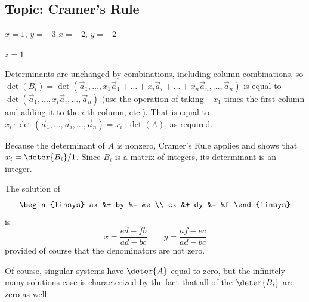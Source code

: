 \subsection{Topic: Cramer's Rule}
\begin{ans}{1}
      \begin{exparts*}
        \partsitem $x=1$, $y=-3$
        \partsitem $x=-2$, $y=-2$
      \end{exparts*}
    
\end{ans}
\begin{ans}{2}
      \( z=1 \)
    
\end{ans}
\begin{ans}{3}
      Determinants are unchanged by combinations,
      including column combinations, so
      \( \det(B_i)=\det(\vec{a}_1,\dots,
      x_1\vec{a}_1+\dots+x_i\vec{a}_i+\dots+x_n\vec{a}_n,\dots,\vec{a}_n) \)
      is equal to
      $\det(\vec{a}_1,\dots,x_i\vec{a}_i,\dots,\vec{a}_n)$
      (use the operation of taking $-x_1$ times the first column and adding
      it to the $i$-th column, etc.).
      That is equal to
      $x_i\cdot\det(\vec{a}_1,\dots,\vec{a}_i,\dots,\vec{a}_n)
         =x_i\cdot\det(A)$,
      as required.
    
\end{ans}
\begin{ans}{4}
      Because the determinant of $A$ is nonzero, Cramer's Rule applies and
      shows that $x_i=\deter{B_i}/1$.
      Since $B_i$ is a matrix of integers, its determinant is an integer.
    
\end{ans}
\begin{ans}{5}
      The solution of
      \begin{equation*}
        \begin{linsys}{2}
           ax  &+  by  &=  &e  \\
           cx  &+  dy  &=  &f
        \end{linsys}
      \end{equation*}
      is
      \begin{equation*}
        x=\frac{ed-fb}{ad-bc}
        \qquad
        y=\frac{af-ec}{ad-bc}
      \end{equation*}
      provided of course that the denominators are not zero.
    
\end{ans}
\begin{ans}{6}
      Of course, singular systems have \( \deter{A} \) equal to zero, but
      the infinitely many solutions case is characterized by the fact that
      all of the \( \deter{B_i} \) are zero as well.
    
\end{ans}

